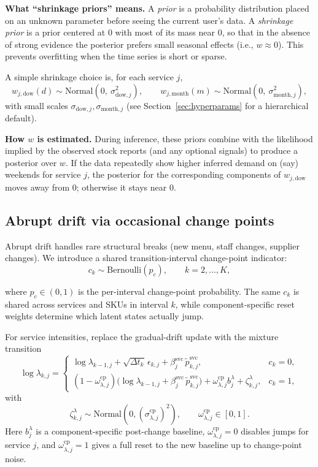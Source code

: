 \documentclass[11pt]{article}
\begin{document}
\textbf{What ``shrinkage priors'' means.} A \emph{prior} is a probability distribution placed on an unknown parameter before seeing the current user's data.
A \emph{shrinkage prior} is a prior centered at 0 with most of its mass near 0, so that in the absence of strong evidence the posterior prefers small seasonal effects (i.e., $w\approx 0$).
This prevents overfitting when the time series is short or sparse.

A simple shrinkage choice is, for each service $j$,
\[
  w_{j,\text{dow}}(d) \sim \text{Normal}(0,\ \sigma^2_{\text{dow},j}),\qquad
  w_{j,\text{month}}(m) \sim \text{Normal}(0,\ \sigma^2_{\text{month},j}),
\]
with small scales $\sigma_{\text{dow},j},\sigma_{\text{month},j}$ (see Section~\ref{sec:hyperparams} for a hierarchical default).

\textbf{How $w$ is estimated.} During inference, these priors combine with the likelihood implied by the observed stock reports (and any optional signals) to produce a posterior over $w$.
If the data repeatedly show higher inferred demand on (say) weekends for service $j$, the posterior for the corresponding components of $w_{j,\text{dow}}$ moves away from 0; otherwise it stays near 0.

\subsection{Abrupt drift via occasional change points}

Abrupt drift handles rare structural breaks (new menu, staff changes, supplier changes).
We introduce a shared transition-interval change-point indicator:
\[
  c_k \sim \text{Bernoulli}(p_c),\qquad k=2,\dots,K,
\]

where $p_c\in(0,1)$ is the per-interval change-point probability.
The same $c_k$ is shared across services and SKUs in interval $k$, while component-specific reset weights determine which latent states actually jump.

For service intensities, replace the gradual-drift update with the mixture transition
\begin{equation}\label{eq:cp-service}
  \log \lambda_{k,j}=
  \begin{cases}
    \log \lambda_{k-1,j} + \sqrt{\Delta t_k}\,\epsilon_{k,j} + \beta^{\mathrm{svc}}_j\,\tilde p^{\mathrm{svc}}_{k,j}, & c_k=0,\\
    (1-\omega^{\mathrm{cp}}_{\lambda,j})\bigl(\log \lambda_{k-1,j} + \beta^{\mathrm{svc}}_j\,\tilde p^{\mathrm{svc}}_{k,j}\bigr) + \omega^{\mathrm{cp}}_{\lambda,j} b^{\lambda}_j + \zeta^{\lambda}_{k,j}, & c_k=1,
  \end{cases}
\end{equation}
with
\[
  \zeta^{\lambda}_{k,j}\sim\text{Normal}(0,(\sigma^{\mathrm{cp}}_{\lambda,j})^2),\qquad \omega^{\mathrm{cp}}_{\lambda,j}\in[0,1].
\]
Here $b^{\lambda}_j$ is a component-specific post-change baseline, $\omega^{\mathrm{cp}}_{\lambda,j}=0$ disables jumps for service $j$, and $\omega^{\mathrm{cp}}_{\lambda,j}=1$ gives a full reset to the new baseline up to change-point noise.
\end{document}
